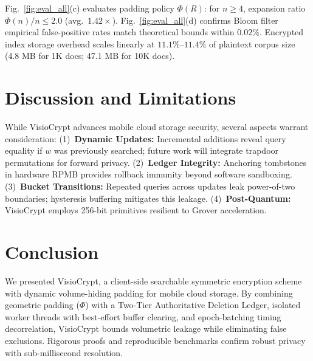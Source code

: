 \documentclass[10pt,conference]{IEEEtran}
\newenvironment{revised}{\color{revcolor}}{}
\newenvironment{revised}{\color{revcolor}}{}
\begin{document}
\begin{revised}
Fig.~\ref{fig:eval_all}(c) evaluates padding policy $\Phi(R)$: for $n \ge 4$, expansion ratio $\Phi(n)/n \le 2.0$ (avg.\ $1.42\times$). Fig.~\ref{fig:eval_all}(d) confirms Bloom filter empirical false-positive rates match theoretical bounds within $0.02\%$. Encrypted index storage overhead scales linearly at $11.1\%$--$11.4\%$ of plaintext corpus size (4.8 MB for 1K docs; 47.1 MB for 10K docs).

\section{Discussion and Limitations}
\enlargethispage{3.0\baselineskip}
While VisioCrypt advances mobile cloud storage security, several aspects warrant consideration: (1)~\textbf{Dynamic Updates:} Incremental additions reveal query equality if $w$ was previously searched; future work will integrate trapdoor permutations \cite{bost2016sophos} for forward privacy. (2)~\textbf{Ledger Integrity:} Anchoring tombstones in hardware RPMB \cite{pinto2019} provides rollback immunity beyond software sandboxing. (3)~\textbf{Bucket Transitions:} Repeated queries across updates leak power-of-two boundaries; hysteresis buffering mitigates this leakage. (4)~\textbf{Post-Quantum:} VisioCrypt employs 256-bit primitives resilient to Grover acceleration.

\end{revised}
\section{Conclusion}

We presented VisioCrypt, a client-side searchable symmetric encryption scheme with dynamic volume-hiding padding for mobile cloud storage. By combining geometric padding ($\Phi$) with a Two-Tier Authoritative Deletion Ledger, isolated worker threads with best-effort buffer clearing, and epoch-batching timing decorrelation, VisioCrypt bounds volumetric leakage while eliminating false exclusions. Rigorous proofs and reproducible benchmarks confirm robust privacy with sub-millisecond resolution.


\let\oldbibliography\thebibliography
\renewcommand{\thebibliography}[1]{%
  \oldbibliography{#1}%
  \fontsize{4.85pt}{5.5pt}\selectfont
  \setlength{\itemsep}{0pt}%
  \setlength{\parsep}{0pt}%
}

\end{document}
